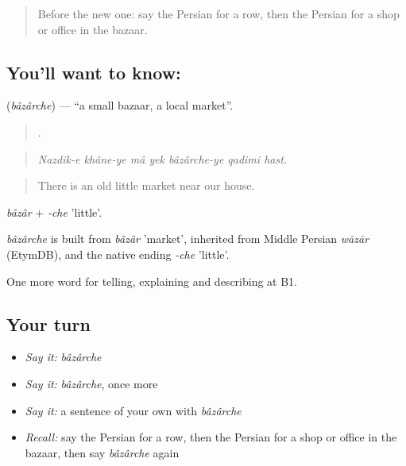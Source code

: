 \label{lesson:FA-C457-bazarche}



\begin{quote}
Before the new one: say the Persian for a row, then the Persian for a shop or office in the bazaar.
\end{quote}

\subsection*{You'll want to know: }
\textbf{} (\emph{bâzârche}) — \textquotedblleft{}a small bazaar, a local market\textquotedblright{}.

\begin{quote}
      .
\end{quote}

\begin{quote}
\emph{Nazdik-e khâne-ye mâ yek bâzârche-ye qadimi hast.}
\end{quote}

\begin{quote}
There is an old little market near our house.
\end{quote}

\emph{bâzâr} + \emph{-che} 'little'.

\begin{cousinweb}
\emph{bâzârche} is built from \emph{bâzâr} 'market', inherited from Middle Persian \emph{wāzār} (EtymDB), and the native ending \emph{-che} 'little'.
\end{cousinweb}

\begin{grammarlens}[title={What you've built}]
One more word for telling, explaining and describing at B1.
\end{grammarlens}

\subsection*{Your turn}
\begin{itemize}
\raggedright
  \item \emph{Say it:} \emph{bâzârche}
  \item \emph{Say it:} \emph{bâzârche}, once more
  \item \emph{Say it:} a sentence of your own with \emph{bâzârche}
  \item \emph{Recall:} say the Persian for a row, then the Persian for a shop or office in the bazaar, then say \emph{bâzârche} again
\end{itemize}

